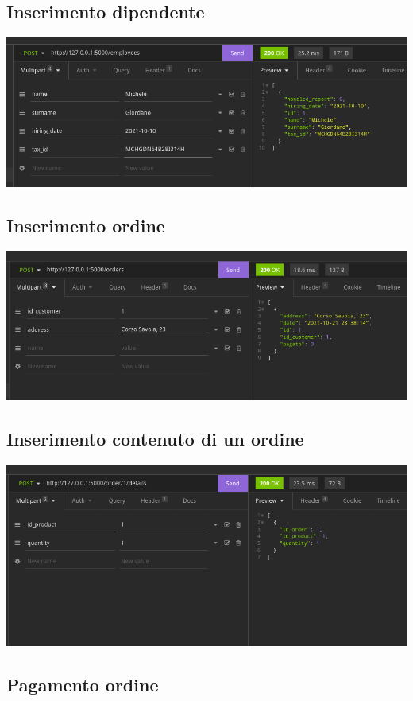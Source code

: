 \subsection{Inserimento dipendente}

\includegraphics[scale=0.35]{images/inserimento_dipendente.png}

\subsection{Inserimento ordine}
\includegraphics[scale=0.34]{images/ordine.png}

\subsection{Inserimento contenuto di un ordine}

\includegraphics[scale=0.35]{images/inserimento_contenuto.png}


\subsection{Pagamento ordine}

